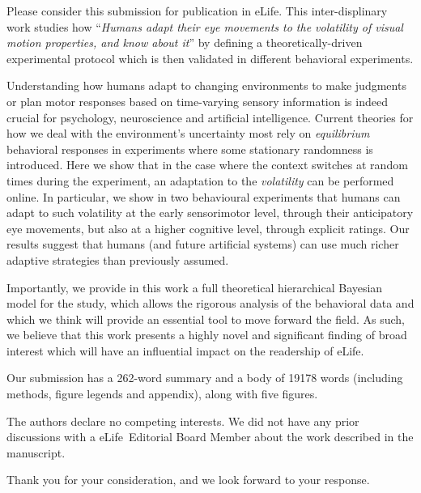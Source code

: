\documentclass[stdletter,8pt,dateno]{newlfm}%
\newcommand{\Title}{Humans adapt their eye movements to the volatility of visual motion properties, and know about it}
\newcommand{\Journal}{eLife}%
\begin{document}
\begin{newlfm}
%

Please consider this submission for publication in \Journal . This inter-displinary work studies how ``\emph{\Title}'' by defining a theoretically-driven experimental protocol which is then validated in different behavioral experiments.

Understanding how humans adapt to changing environments to make judgments or plan motor responses based on time-varying sensory information 
is indeed crucial for psychology, neuroscience
and artificial intelligence.  
Current theories for how we deal with the environment's uncertainty most rely on \emph{equilibrium} behavioral responses in experiments where some stationary randomness is introduced.  
Here we show that in the case where the context switches at random times during the experiment, an adaptation to the \emph{volatility} can be performed online.
In particular, we show in two behavioural experiments that humans can adapt to such volatility at the early sensorimotor level, through their anticipatory eye movements, but also at a higher cognitive level, through explicit ratings. 
Our results suggest that humans (and future artificial
systems) can use much richer adaptive strategies than previously
assumed.

Importantly, we provide in this work a full theoretical hierarchical Bayesian model for the study, which allows the rigorous analysis of the behavioral data and which we think will provide an essential tool to move forward the field. 
As such, we believe that this work presents a highly novel and significant finding of broad interest 
which will have an influential impact on the readership of \Journal .

Our submission has a 262-word summary and a body of 19178 words
(including methods, figure legends and appendix), along with five figures.

The authors declare no competing interests.
We did not have any prior discussions with
a \Journal\ Editorial Board Member
about the work described in the manuscript.

Thank you for your consideration, and we look forward to your response.

\end{newlfm}
\end{document}

